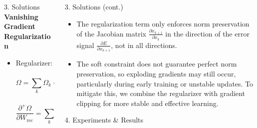 \documentclass[final]{beamer}
\begin{document}
\begin{frame}[t]
\begin{columns}[t,totalwidth=\textwidth]
\begin{column}{0.3\textwidth}
\begin{block}{3. Solutions }
    \textbf{Vanishing Gradient Regularization}
      \begin{itemize}
        \item Regularizer: \[
            \Omega = \sum_k \Omega_k = \sum_k \left(  \frac{ \left\| \frac{\partial E}{\partial x_{k+1}} \cdot \frac{\partial x_{k+1}}{\partial x_k} \right\| }
            { \left\| \frac{\partial E}{\partial x_{k+1}} \right\| } - 1 
            \right)^2
            \]
            \[
            \textstyle
            \frac{\partial^+ \Omega}{\partial W_{\text{rec}}} = \sum_k 
            \frac{\partial^+}{\partial W_{\text{rec}}} \left(
            \left( 
            \frac{ \left\| \frac{\partial E}{\partial x_{k+1}} \cdot W_{\text{rec}}^\top \cdot \operatorname{diag}\left( \sigma'(x_k) \right) \right\|^2 }
            { \left\| \frac{\partial E}{\partial x_{k+1}} \right\|^2 } - 1 
            \right)^2
            \right)
            \]
        \end{itemize}
    \end{block}
\end{column}



    \begin{column}{0.35\textwidth}
        \begin{block}{3. Solutions (cont.) }

        \begin{itemize}
        \item The regularization term only enforces norm preservation of the Jacobian matrix
                $\frac{\partial x_{k+1}}{\partial x_k}$ in the direction of the error signal 
                $\frac{\partial E}{\partial x_{k+1}}$, not in all directions.
        \item The soft constraint does not guarantee perfect norm preservation, so exploding gradients may still occur, particularly during early training or unstable updates. To mitigate this, we combine the regularizer with gradient clipping for more stable and effective learning.


      \end{itemize}
\end{block}
    \begin{block}{4. Experiments \& Results}


\end{block}
\end{column}
\end{columns}
\end{frame}
\end{document}
